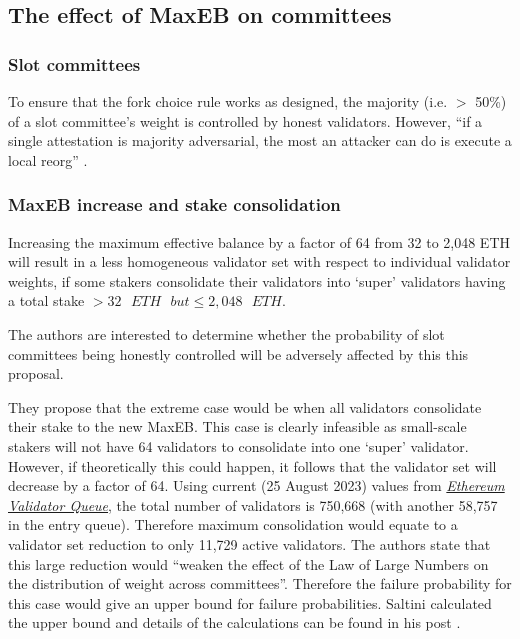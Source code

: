\documentclass{article}
\begin{document}
\subsection{The effect of MaxEB on committees}
\subsubsection*{Slot committees}
To ensure that the fork choice rule works as designed, the majority (i.e. $>$ 
50\%) of a slot committee's weight is controlled by honest validators. However,
``if a single attestation is majority adversarial, the most an attacker can do
is execute a local reorg''  \cite{damato2023}.

\subsubsection*{MaxEB increase and stake consolidation}
Increasing the maximum effective balance by a factor of 64 from 32 to 2,048 ETH
will result in a less homogeneous validator set with respect to individual
validator weights, if some stakers consolidate their validators into `super'
validators having a total stake $ > 32 \texttt{ } ETH \texttt{ } but \leqslant
2,048 \texttt{ }  ETH$.

The authors are interested to determine whether the probability of slot
committees being honestly controlled will be adversely affected by this this
proposal.

They propose that the extreme case would be when all validators consolidate
their stake to the new MaxEB. This case is clearly infeasible as small-scale
stakers will not have 64 validators to consolidate into one `super' validator.
However, if theoretically this could happen, it follows that the validator set
will decrease by a factor of 64. Using current (25 August 2023) values from
\href{https://www.validatorqueue.com/}{\textit{Ethereum Validator Queue}}, the
total number of validators is 750,668 (with another 58,757 in the entry queue).
Therefore maximum consolidation would equate to a validator set reduction to
only 11,729 active validators. The authors state that this large reduction
would ``weaken the effect of the Law of Large Numbers on the distribution of
weight across committees''. Therefore the failure probability for this case
would give an upper bound for failure probabilities. Saltini calculated the
upper bound and details of the calculations can be found in his post
\cite{Saltini2023}.
\end{document}
